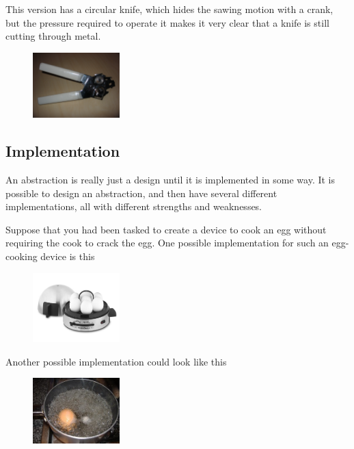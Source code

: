 This version has a circular knife, which hides the sawing motion with a crank, but the pressure required to operate it makes it very clear that a knife is still cutting through metal.

\begin{figure}[H]
\centering
\includegraphics[width=0.3\textwidth]{pictures/Can_opener.JPG}
\label{fig:canOpener3}
\end{figure}

\subsection{Implementation}

An abstraction is really just a design until it is implemented in some way. It is possible to design an abstraction, and then have several different implementations, all with different strengths and weaknesses.

Suppose that you had been tasked to create a device to cook an egg without requiring the cook to crack the egg. One possible implementation for such an egg-cooking device is this

\begin{figure}[H]
\centering
\includegraphics[width=0.3\textwidth]{pictures/chefschoice-electric-egg-cooker-c.jpg}
\label{fig:eggCooker1}
\end{figure}

Another possible implementation could look like this

\begin{figure}[H]
\centering
\includegraphics[width=0.3\textwidth]{pictures/boiled-egg-300x225.jpg}
\label{fig:eggCooker2}
\end{figure}


